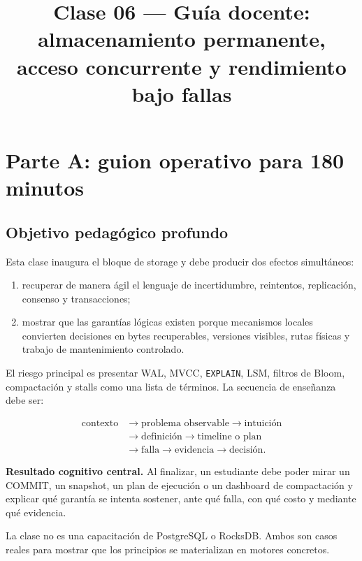 \documentclass[variant=docente,cover=institutional,mode=screen]{ua-engineering-v6-article}
\title{Clase 06 --- Guía docente: almacenamiento permanente, acceso concurrente y rendimiento bajo fallas}
\author{\UAProfessor}
\date{\UADate}
\begin{document}
\setlength{\emergencystretch}{2em}
\maketitle
\tableofcontents
\clearpage

\section{Parte A: guion operativo para 180 minutos}

\subsection{Objetivo pedagógico profundo}

Esta clase inaugura el bloque de storage y debe producir dos efectos simultáneos:

\begin{enumerate}
\item recuperar de manera ágil el lenguaje de incertidumbre, reintentos, replicación, consenso y transacciones;
\item mostrar que las garantías lógicas existen porque mecanismos locales convierten decisiones en bytes recuperables, versiones visibles, rutas físicas y trabajo de mantenimiento controlado.
\end{enumerate}

El riesgo principal es presentar WAL, MVCC, \texttt{EXPLAIN}, LSM, filtros de Bloom, compactación y stalls como una lista de términos. La secuencia de enseñanza debe ser:

\[
\begin{aligned}
\text{contexto} &\rightarrow \text{problema observable} \rightarrow \text{intuición} \\
&\rightarrow \text{definición} \rightarrow \text{timeline o plan} \\
&\rightarrow \text{falla} \rightarrow \text{evidencia} \rightarrow \text{decisión}.
\end{aligned}
\]

\begin{uakeybox}
\textbf{Resultado cognitivo central.} Al finalizar, un estudiante debe poder mirar un COMMIT, un snapshot, un plan de ejecución o un dashboard de compactación y explicar qué garantía se intenta sostener, ante qué falla, con qué costo y mediante qué evidencia.
\end{uakeybox}

La clase no es una capacitación de PostgreSQL o RocksDB. Ambos son casos reales para mostrar que los principios se materializan en motores concretos.
\end{document}
